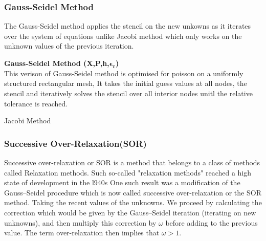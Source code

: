 \subsubsection{Gauss-Seidel Method}
The Gauss-Seidel method applies the stencil on the new unkowns as it iterates over the system of equations unlike Jacobi method which only works on the unknown values of the previous iteration.\\[2mm]
\begin{algorithm}[H]
    \textbf{Gauss-Seidel Method (X,P,h,$\mathbf{\epsilon_r}$)}\\[-1pt]
    This verison of Gauss-Seidel method is optimised for poisson on a uniformly structured rectangular mesh, It takes the initial guess values at all nodes, the stencil and iteratively solves the stencil over all interior nodes unitl the relative tolerance is reached.  \\[2mm]
    \caption{Jacobi Method}
\end{algorithm}


\subsubsection{Successive Over-Relaxation(SOR)}
Successive over-relaxation or SOR is a method that belongs to a class of methods called Relaxation methods. 
Such so-called "relaxation methods" reached a high state of development in the l940s One such result was a modiﬁcation of the Gauss–Seidel procedure which is now called successive over-relaxation or the SOR method.
Taking the recent values of the unknowns. We proceed by calculating the correction which would be given by the Gauss–Seidel iteration (iterating on new unknowns), and then multiply this correction by $\omega$ before adding to the previous value. The term over-relaxation then implies that $\omega>1$. \\[2mm]

